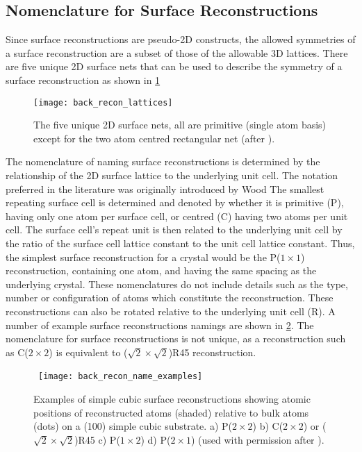 \subsection{Nomenclature for Surface Reconstructions} Since surface reconstructions are pseudo-2D constructs, the allowed symmetries of a surface reconstruction are a subset of those of the allowable 3D lattices.
There are five unique 2D surface nets that can be used to describe the symmetry of a surface reconstruction as shown in \cref{fig:back_recon_lattices}
\begin{figure}
 \centering \texttt{[image: back\_recon\_lattices]}
 \caption[2D Surface Nets]{\label{fig:back_recon_lattices}The five unique 2D surface nets, all are primitive (single atom basis) except for the two atom centred rectangular net (after \cite{ohring2001materials}).}
\end{figure}

The nomenclature of naming surface reconstructions is determined by the relationship of the 2D surface lattice to the underlying unit cell.
The notation preferred in the literature was originally introduced by Wood\cite{Wood1964} The smallest repeating surface cell is determined and denoted by whether it is primitive (P), having only one atom per surface cell, or centred (C) having two atoms per unit cell.
The surface cell's repeat unit is then related to the underlying unit cell by the ratio of the surface cell lattice constant to the unit cell lattice constant.
Thus, the simplest surface reconstruction for a crystal would be the P(\(1 \times 1\)) reconstruction, containing one atom, and having the same spacing as the underlying crystal.
These nomenclatures do not include details such as the type, number or configuration of atoms which constitute the reconstruction.
These reconstructions can also be rotated relative to the underlying unit cell (R)\@. A number of example surface reconstructions namings are shown in \cref{fig:back_recon_name_examples}.
The nomenclature for surface reconstructions is not unique, as a reconstruction such as C(\(2\times2\)) is equivalent to
(\(\sqrt{2}\times\sqrt{2}\))R45\degree{}
reconstruction.
\begin{figure}
 \centering\ \texttt{[image: back\_recon\_name\_examples]}
 \caption[Examples of surface reconstructions]{\label{fig:back_recon_name_examples}Examples of simple cubic surface reconstructions showing atomic positions of reconstructed atoms (shaded) relative to bulk atoms (dots) on a (100) simple cubic substrate.
  a) P(\(2 \times 2\)) b) C(\(2 \times 2\)) or
  (\(\sqrt{2}\times\sqrt{2}\))R45\degree{}
  c) P(\(1 \times 2\)) d) P(\(2 \times 1\)) (used with permission after \cite{ohring2001materials}).}
\end{figure}

